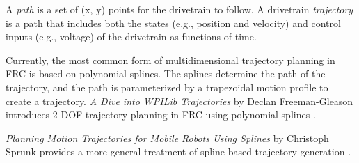 A \textit{path} is a set of (x, y) points for the drivetrain to follow. A
drivetrain \textit{trajectory} is a path that includes both the states (e.g.,
position and velocity) and control inputs (e.g., voltage) of the drivetrain as
functions of time.

Currently, the most common form of multidimensional trajectory planning in FRC
is based on polynomial splines. The splines determine the path of the
trajectory, and the path is parameterized by a trapezoidal motion profile to
create a trajectory. \textit{A Dive into WPILib Trajectories} by Declan
Freeman-Gleason introduces 2-DOF trajectory planning in FRC using polynomial
splines \cite{bib:a_dive_into_wpilib_trajectories}.

\textit{Planning Motion Trajectories for Mobile Robots Using Splines} by
Christoph Sprunk provides a more general treatment of spline-based trajectory
generation \cite{bib:spline_traj_sprunk}.
